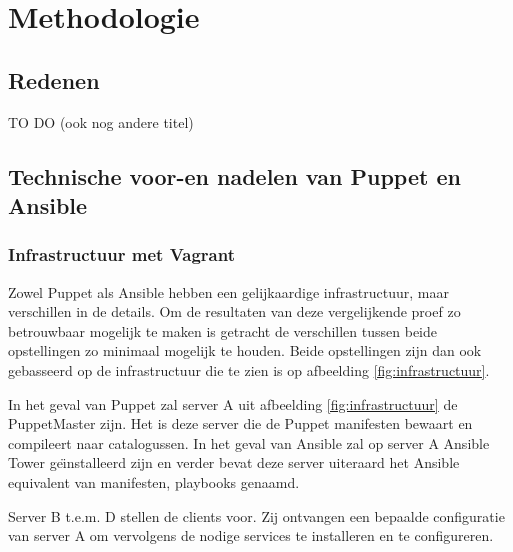 
\chapter{Methodologie}
\label{ch:methodologie}

\section{Redenen}
\label{sec:Redenen}

TO DO (ook nog andere titel)

\section{ Technische voor-en nadelen van Puppet en Ansible}
\label{sec: technische-voor-en-nadelen-van-Puppet-en-Ansible}

\subsection{ Infrastructuur met Vagrant}
\label{sec: infrastructuur-met-Vagrant}

Zowel Puppet als Ansible hebben een gelijkaardige infrastructuur, maar verschillen in de details. Om de resultaten van deze vergelijkende proef zo betrouwbaar mogelijk te maken is getracht de verschillen tussen beide opstellingen zo minimaal mogelijk te houden. Beide opstellingen zijn dan ook gebasseerd op de infrastructuur die te zien is op afbeelding \ref{fig:infrastructuur}.

In het geval van Puppet zal server A uit afbeelding \ref{fig:infrastructuur} de PuppetMaster zijn. Het is deze server die de Puppet manifesten bewaart en compileert naar catalogussen. In het geval van Ansible zal op server A Ansible Tower ge{\"\i}nstalleerd zijn en verder bevat deze server uiteraard het Ansible equivalent van manifesten, playbooks genaamd. 

Server B t.e.m. D stellen de clients voor. Zij ontvangen een bepaalde configuratie van server A om vervolgens de nodige services te installeren en te configureren.

